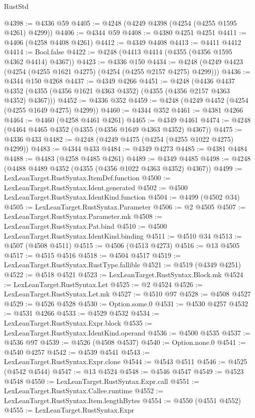 \begin{lexlean}{RustStd}
\begin{coremodule}
@4398 := @4336 @59
@4405 := @4248 (@4249 @4398 (@4254 (@4255 @1595 @4261) @4299))
@4406 := @4344 @59
@4408 := @4380 @4251 @4251
@4411 := @4406 (@4258 @4408 @4261)
@4412 := @4349 @4408
@4413 := @4411 @4412
@4414 := Bool.false
@4422 := @4248 (@4413 @4414 (@4355 (@4356 @1595 @4362 @4414) @4367))
@4423 := @4336 @150
@4434 := @4248 (@4249 @4423 (@4254 (@4255 @1621 @4275) (@4254 (@4255 @2157 @4275) @4299)))
@4436 := @4344 @150 @4268
@4437 := @4349 @4266
@4451 := @4248
    (@4436 @4437 @4352 (@4355 (@4356 @1621 @4363 @4352) (@4355 (@4356 @2157 @4363 @4352) @4367)))
@4452 := @4336 @352
@4459 := @4248 (@4249 @4452 (@4254 (@4255 @1649 @4275) @4299))
@4460 := @4344 @352
@4461 := @4381 @4266
@4464 := @4460 (@4258 @4461 @4261)
@4465 := @4349 @4461
@4474 := @4248 (@4464 @4465 @4352 (@4355 (@4356 @1649 @4363 @4352) @4367))
@4475 := @4336 @433
@4482 := @4248 (@4249 @4475 (@4254 (@4255 @1022 @4275) @4299))
@4483 := @4344 @433
@4484 := @4349 @4273
@4485 := @4381 @4484
@4488 := @4483 (@4258 @4485 @4261)
@4489 := @4349 @4485
@4498 := @4248 (@4488 @4489 @4352 (@4355 (@4356 @1022 @4363 @4352) @4367))
@4499 := LexLeanTarget.RustSyntax.ItemDef.function
@4500 := LexLeanTarget.RustSyntax.Ident.generated
@4502 := @4500 LexLeanTarget.RustSyntax.IdentKind.function
@4504 := @4499 (@4502 @34)
@4505 := LexLeanTarget.RustSyntax.Parameter
@4506 := @2 @4505
@4507 := LexLeanTarget.RustSyntax.Parameter.mk
@4508 := LexLeanTarget.RustSyntax.Pat.bind
@4510 := @4500 LexLeanTarget.RustSyntax.IdentKind.binding
@4511 := @4510 @34
@4513 := @4507 (@4508 @4511)
@4515 := @4506 (@4513 @4273)
@4516 := @13 @4505
@4517 := @4515 @4516
@4518 := @4504 @4517
@4519 := LexLeanTarget.RustSyntax.RustType.fallible
@4521 := @4519 (@4349 @4251)
@4522 := @4518 @4521
@4523 := LexLeanTarget.RustSyntax.Block.mk
@4524 := LexLeanTarget.RustSyntax.Let
@4525 := @2 @4524
@4526 := LexLeanTarget.RustSyntax.Let.mk
@4527 := @4510 @97
@4528 := @4508 @4527
@4529 := @4526 @4528
@4530 := Option.some.{0}
@4531 := @4530 @4257
@4532 := @4531 @4266
@4533 := @4529 @4532
@4534 := LexLeanTarget.RustSyntax.Expr.block
@4535 := LexLeanTarget.RustSyntax.IdentKind.operand
@4536 := @4500 @4535
@4537 := @4536 @97
@4539 := @4526 (@4508 @4537)
@4540 := Option.none.{0}
@4541 := @4540 @4257
@4542 := @4539 @4541
@4543 := LexLeanTarget.RustSyntax.Expr.clone
@4544 := @4543 @4511
@4546 := @4525 (@4542 @4544)
@4547 := @13 @4524
@4548 := @4546 @4547
@4549 := @4523 @4548
@4550 := LexLeanTarget.RustSyntax.Expr.call
@4551 := LexLeanTarget.RustSyntax.Callee.runtime
@4552 := LexLeanTarget.RustSyntax.Item.lengthBytes
@4554 := @4550 (@4551 @4552)
@4555 := LexLeanTarget.RustSyntax.Expr

\end{coremodule}
\end{lexlean}
